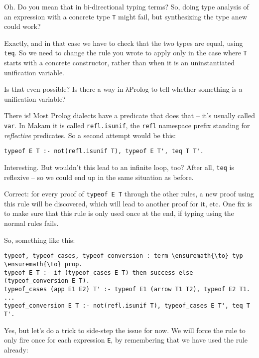 \heroSTUDENT{} Oh. Do you mean that in bi-directional typing terms? So, doing
type analysis of an expression with a concrete type \texttt{T} might
fail, but synthesizing the type anew could work?

\heroADVISOR{} Exactly, and in that case we have to check that the two types
are equal, using \texttt{teq}. So we need to change the rule you wrote
to apply only in the case where \texttt{T} starts with a concrete
constructor, rather than when it is an uninstantiated unification
variable.

\heroSTUDENT{} Is that even possible? Is there a way in \foreignlanguage{greek}{λ}Prolog to tell
whether something is a unification variable?

\heroADVISOR{} There is! Most Prolog dialects have a predicate that does that
-- it's usually called \texttt{var}. In Makam it is called
\texttt{refl.isunif}, the \texttt{refl} namespace prefix standing for
\emph{reflective} predicates. So a second attempt would be this:

\begin{verbatim}
typeof E T :- not(refl.isunif T), typeof E T', teq T T'.
\end{verbatim}

\heroSTUDENT{} Interesting. But wouldn't this lead to an infinite loop, too?
After all, \texttt{teq} is reflexive -- so we could end up in the same
situation as before.

\heroADVISOR{} Correct: for every proof of
\texttt{typeof\ E\ T\textquotesingle{}} through the other rules, a new
proof using this rule will be discovered, which will lead to another
proof for it, etc. One fix is to make sure that this rule is only used
once at the end, if typing using the normal rules fails.

\heroSTUDENT{} So, something like this:

\begin{verbatim}
typeof, typeof_cases, typeof_conversion : term \ensuremath{\to} typ \ensuremath{\to} prop.
typeof E T :- if (typeof_cases E T) then success else (typeof_conversion E T).
typeof_cases (app E1 E2) T' :- typeof E1 (arrow T1 T2), typeof E2 T1.
...
typeof_conversion E T :- not(refl.isunif T), typeof_cases E T', teq T T'.
\end{verbatim}

\heroADVISOR{} Yes, but let's do a trick to side-step the issue for now. We
will force the rule to only fire once for each expression \texttt{E}, by
remembering that we have used the rule already:

